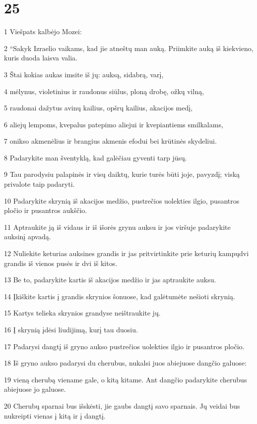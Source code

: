 \chapter{25}


\par 1 Viešpats kalbėjo Mozei: 
\par 2 “Sakyk Izraelio vaikams, kad jie atneštų man auką. Priimkite auką iš kiekvieno, kuris duoda laisva valia. 
\par 3 Štai kokias aukas imsite iš jų: auksą, sidabrą, varį, 
\par 4 mėlynus, violetinius ir raudonus siūlus, ploną drobę, ožkų vilną, 
\par 5 raudonai dažytus avinų kailius, opšrų kailius, akacijos medį, 
\par 6 aliejų lempoms, kvepalus patepimo aliejui ir kvepiantiems smilkalams, 
\par 7 onikso akmenėlius ir brangius akmenis efodui bei krūtinės skydeliui. 
\par 8 Padarykite man šventyklą, kad galėčiau gyventi tarp jūsų. 
\par 9 Tau parodysiu palapinės ir visų daiktų, kurie turės būti joje, pavyzdį; viską privalote taip padaryti. 
\par 10 Padarykite skrynią iš akacijos medžio, pustrečios uolekties ilgio, pusantros pločio ir pusantros aukščio. 
\par 11 Aptraukite ją iš vidaus ir iš išorės grynu auksu ir jos viršuje padarykite auksinį apvadą. 
\par 12 Nuliekite keturias auksines grandis ir jas pritvirtinkite prie keturių kampų­dvi grandis iš vienos pusės ir dvi iš kitos. 
\par 13 Be to, padarykite kartis iš akacijos medžio ir jas aptraukite auksu. 
\par 14 Įkiškite kartis į grandis skrynios šonuose, kad galėtumėte nešioti skrynią. 
\par 15 Kartys telieka skrynios grandyse­ neištraukite jų. 
\par 16 Į skrynią įdėsi liudijimą, kurį tau duosiu. 
\par 17 Padarysi dangtį iš gryno aukso pustrečios uolekties ilgio ir pusantros pločio. 
\par 18 Iš gryno aukso padarysi du cherubus, nukalsi juos abiejuose dangčio galuose: 
\par 19 vieną cherubą viename gale, o kitą kitame. Ant dangčio padarykite cherubus abiejuose jo galuose. 
\par 20 Cherubų sparnai bus išskėsti, jie gaubs dangtį savo sparnais. Jų veidai bus nukreipti vienas į kitą ir į dangtį. 
